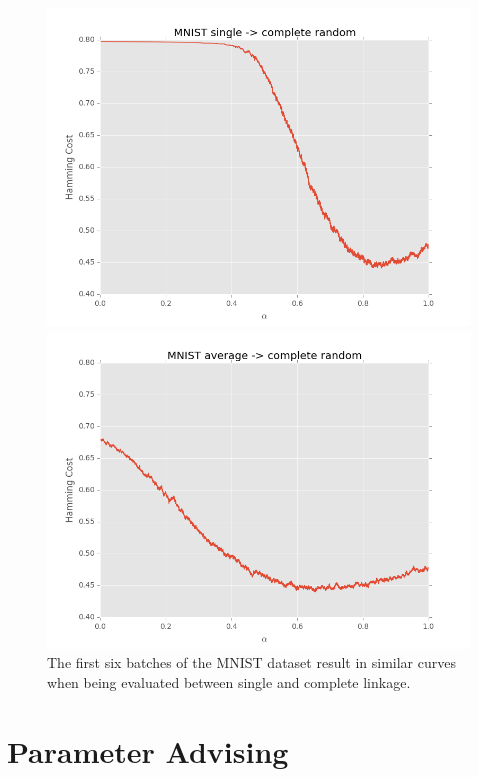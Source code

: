 \begin{figure}[h]
\centering
\begin{minipage}{.45\textwidth}
  \centering
  \includegraphics[width=\linewidth]{images/mnist-sc-random}
\end{minipage}
\begin{minipage}{.45\textwidth}
  \centering
  \includegraphics[width=\linewidth]{images/mnist-ac-random}
\end{minipage}
\caption{The first six batches of the MNIST dataset result in similar curves when being evaluated between single and complete linkage.}
\label{fig:mnist1000sc}
\end{figure}

\section{Parameter Advising}